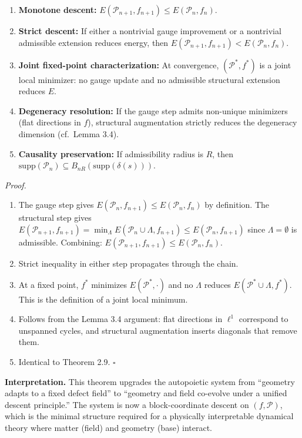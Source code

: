 \documentclass[
]{article}
\begin{document}
\begin{enumerate}
\def\labelenumi{(\alph{enumi})}
\item
  \textbf{Monotone descent:}
  \(E(\mathcal{P}_{n+1}, f_{n+1}) \leq E(\mathcal{P}_n, f_n)\).
\item
  \textbf{Strict descent:} If either a nontrivial gauge improvement or a
  nontrivial admissible extension reduces energy, then
  \(E(\mathcal{P}_{n+1}, f_{n+1}) < E(\mathcal{P}_n, f_n)\).
\item
  \textbf{Joint fixed-point characterization:} At convergence,
  \((\mathcal{P}^*, f^*)\) is a joint local minimizer: no gauge update
  and no admissible structural extension reduces \(E\).
\item
  \textbf{Degeneracy resolution:} If the gauge step admits non-unique
  minimizers (flat directions in \(f\)), structural augmentation
  strictly reduces the degeneracy dimension (cf.~Lemma 3.4).
\item
  \textbf{Causality preservation:} If admissibility radius is \(R\),
  then
  \(\mathrm{supp}(\mathcal{P}_n) \subseteq B_{nR}(\mathrm{supp}(\delta(s)))\).
\end{enumerate}

\emph{Proof.}

\begin{enumerate}
\def\labelenumi{(\alph{enumi})}
\item
  The gauge step gives
  \(E(\mathcal{P}_n, f_{n+1}) \leq E(\mathcal{P}_n, f_n)\) by
  definition. The structural step gives
  \(E(\mathcal{P}_{n+1}, f_{n+1}) = \min_\Lambda E(\mathcal{P}_n \cup \Lambda, f_{n+1}) \leq E(\mathcal{P}_n, f_{n+1})\)
  since \(\Lambda = \emptyset\) is admissible. Combining:
  \(E(\mathcal{P}_{n+1}, f_{n+1}) \leq E(\mathcal{P}_n, f_n)\).
\item
  Strict inequality in either step propagates through the chain.
\item
  At a fixed point, \(f^*\) minimizes \(E(\mathcal{P}^*, \cdot)\) and no
  \(\Lambda\) reduces \(E(\mathcal{P}^* \cup \Lambda, f^*)\). This is
  the definition of a joint local minimum.
\item
  Follows from the Lemma 3.4 argument: flat directions in \(\ell^1\)
  correspond to unspanned cycles, and structural augmentation inserts
  diagonals that remove them.
\item
  Identical to Theorem 2.9. \(\square\)
\end{enumerate}

\textbf{Interpretation.} This theorem upgrades the autopoietic system
from ``geometry adapts to a fixed defect field'' to ``geometry and field
co-evolve under a unified descent principle.'' The system is now a
block-coordinate descent on \((f, \mathcal{P})\), which is the minimal
structure required for a physically interpretable dynamical theory where
matter (field) and geometry (base) interact.
\end{document}
